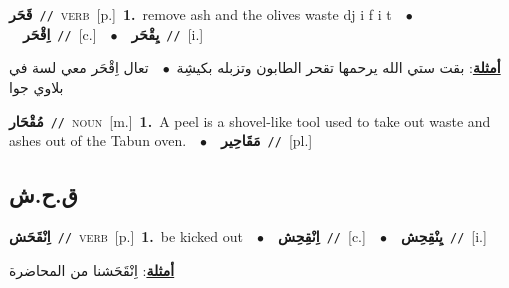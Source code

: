 \documentclass[10pt,a4paper,twoside]{article} %
\begin{document}
\begin{multicols}{2}
{\setlength\topsep{0pt}\textbf{\foreignlanguage{arabic}{قَحَر}}\ {\color{gray}\texttt{//}\color{black}}\ \textsc{verb}\ [p.]\ \textbf{1.}~remove ash and the olives waste dj i f i t\ \ $\bullet$\ \ \setlength\topsep{0pt}\textbf{\foreignlanguage{arabic}{اِقْحَر}}\ {\color{gray}\texttt{//}\color{black}}\ [c.]\ \ $\bullet$\ \ \setlength\topsep{0pt}\textbf{\foreignlanguage{arabic}{يِقْحَر}}\ {\color{gray}\texttt{//}\color{black}}\ [i.]\  \begin{flushright}\color{gray}\foreignlanguage{arabic}{\textbf{\underline{\foreignlanguage{arabic}{أمثلة}}}: بقت ستي الله يرحمها تقحر الطابون وتزبله بكيشِة\ $\bullet$\ \  تعال اِقْحَر معي لسة في بلاوي جوا}\end{flushright}\color{black}} \vspace{2mm}

{\setlength\topsep{0pt}\textbf{\foreignlanguage{arabic}{مُقْحَار}}\ {\color{gray}\texttt{//}\color{black}}\ \textsc{noun}\ [m.]\ \textbf{1.}~A peel is a shovel-like tool used to take out waste and ashes out of the Tabun oven.\ \ $\bullet$\ \ \setlength\topsep{0pt}\textbf{\foreignlanguage{arabic}{مَقَاحِير}}\ {\color{gray}\texttt{//}\color{black}}\ [pl.]\ } \vspace{2mm}

\vspace{-3mm}
\subsection*{\color{blue}\foreignlanguage{arabic}{ق.ح.ش}\color{blue}{}} 

{\setlength\topsep{0pt}\textbf{\foreignlanguage{arabic}{اِنْقَحَش}}\ {\color{gray}\texttt{//}\color{black}}\ \textsc{verb}\ [p.]\ \textbf{1.}~be kicked out\ \ $\bullet$\ \ \setlength\topsep{0pt}\textbf{\foreignlanguage{arabic}{اِنْقِحِش}}\ {\color{gray}\texttt{//}\color{black}}\ [c.]\ \ $\bullet$\ \ \setlength\topsep{0pt}\textbf{\foreignlanguage{arabic}{يِنْقِحِش}}\ {\color{gray}\texttt{//}\color{black}}\ [i.]\  \begin{flushright}\color{gray}\foreignlanguage{arabic}{\textbf{\underline{\foreignlanguage{arabic}{أمثلة}}}: اِنْقَحَشنا من المحاضرة}\end{flushright}\color{black}} \vspace{2mm}


\end{multicols}
\end{document}
